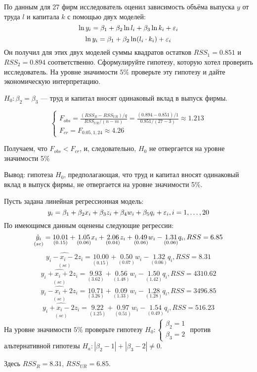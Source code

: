\begin{problem} %
 По данным для 27 фирм исследователь оценил зависимость объёма выпуска $y$ от труда $l$ и капитала $k$ с помощью двух моделей:
\[
\ln y_i = \beta_1 + \beta_2 \ln l_i + \beta_3 \ln k_i + \varepsilon_i
\]
\[
\ln y_i = \beta_1 + \beta_2 \ln (l_i \cdot k_i) + \varepsilon_i
\]
Он получил для этих двух моделей суммы квадратов остатков $RSS_1 = 0.851$ и $RSS_2 = 0.894$ соответственно. Сформулируйте гипотезу, которую хотел проверить исследователь. На уровне значимости $5\%$ проверьте эту гипотезу и дайте экономическую интерпретацию.


\begin{sol}
$H_0: \beta_2=\beta_3$ — труд и капитал вносят одинаковый вклад в выпуск фирмы.

\[
\begin{cases}
F_{obs}=\frac{(RSS_R-RSS_{UR})/q}{RSS_{UR}/(n-m)}=\frac{(0.894-0.851)/1}{0.851/(27-3)}\approx 1.213\\
F_{cr}= F_{0.05,1,24}\approx 4.26
\end{cases}
\]

Получаем, что $F_{obs}<F_{cr}$, и, следовательно, $H_0$ не отвергается на уровне значимости 5\%

Вывод: гипотеза $H_0$, предполагающая, что труд и капитал вносят одинаковый вклад в выпуск фирмы, не отвергается на уровне значимости 5\%.
\end{sol}
\end{problem}



\begin{problem} %

 Пусть задана линейная регрессионная модель:
\[
y_i = \beta_1 + \beta_2 x_{i} + \beta_3 z_{i} + \beta_4 w_{i} + \beta_5 q_{i} + \varepsilon_i, i = 1, \dots, 20
\]
По имеющимся данным оценены следующие регрессии:
\[
\underset{(se)}{\hat{y}_i} = \underset{(0.15)}{10.01} + \underset{(0.06)}{1.05}x_i + \underset{(0.04)}{2.06}z_i + \underset{(0.06)}{0.49}w_i - \underset{(0.06)}{1.31}q_i, RSS = 6.85
\]
\[
\underset{(se)}{\widehat{y_i- x_i - 2z_i}} = \underset{(0.15)}{10.00} + \underset{(0.07)}{0.50}w_i - \underset{(0.06)}{1.32}q_i, RSS = 8.31
\]
\[
\underset{(se)}{\widehat{y_i + x_i + 2z_i}} = \underset{(3.62)}{9.93} + \underset{(1.48)}{0.56}w_i - \underset{(1.42)}{1.50}q_i, RSS = 4310.62
\]
\[
\underset{(se)}{\widehat{y_i - x_i + 2z_i}} = \underset{(3.26)}{10.71} + \underset{(1.33)}{0.09}w_i - \underset{(1.28)}{1.28}q_i, RSS = 3496.85
\]
\[
\underset{(se)}{\widehat{y_i + x_i - 2z_i}} = \underset{(1.25)}{9.22} + \underset{(0.51)}{0.97}w_i - \underset{(0.49)}{1.54}q_i, RSS = 516.23
\]
На уровне значимости $5\%$ проверьте гипотезу $H_0: \begin{cases} \beta_2 = 1 \\ \beta_3 = 2 \end{cases}$ против альтернативной гипотезы $H_a: |\beta_2 - 1| + |\beta_3 - 2| \not= 0$.


\begin{sol}
Здесь $RSS_{R}=8.31$, $RSS_{UR}=6.85$.
\end{sol}
\end{problem}





